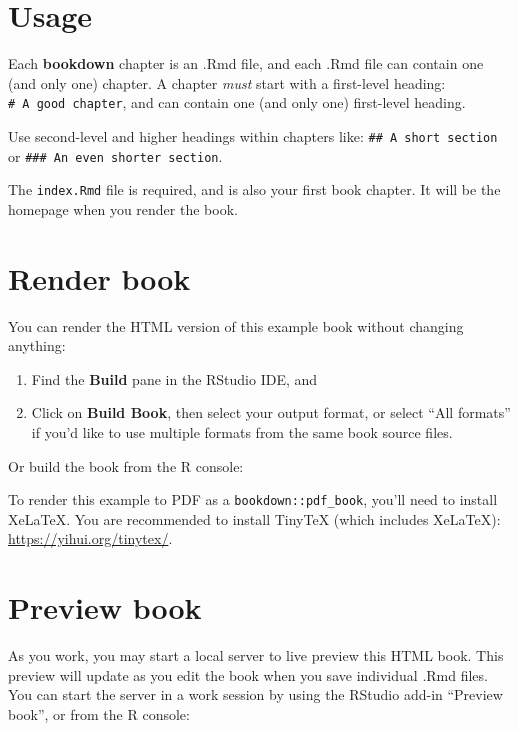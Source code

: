 \documentclass[
]{book}
\begin{document}
\hypertarget{usage}{%
\section*{Usage}\label{usage}}

Each \textbf{bookdown} chapter is an .Rmd file, and each .Rmd file can contain one (and only one) chapter. A chapter \emph{must} start with a first-level heading: \texttt{\#\ A\ good\ chapter}, and can contain one (and only one) first-level heading.

Use second-level and higher headings within chapters like: \texttt{\#\#\ A\ short\ section} or \texttt{\#\#\#\ An\ even\ shorter\ section}.

The \texttt{index.Rmd} file is required, and is also your first book chapter. It will be the homepage when you render the book.

\hypertarget{render-book}{%
\section*{Render book}\label{render-book}}

You can render the HTML version of this example book without changing anything:

\begin{enumerate}
\def\labelenumi{\arabic{enumi}.}
\item
  Find the \textbf{Build} pane in the RStudio IDE, and
\item
  Click on \textbf{Build Book}, then select your output format, or select ``All formats'' if you'd like to use multiple formats from the same book source files.
\end{enumerate}

Or build the book from the R console:

To render this example to PDF as a \texttt{bookdown::pdf\_book}, you'll need to install XeLaTeX. You are recommended to install TinyTeX (which includes XeLaTeX): \url{https://yihui.org/tinytex/}.

\hypertarget{preview-book}{%
\section*{Preview book}\label{preview-book}}

As you work, you may start a local server to live preview this HTML book. This preview will update as you edit the book when you save individual .Rmd files. You can start the server in a work session by using the RStudio add-in ``Preview book'', or from the R console:
\end{document}

